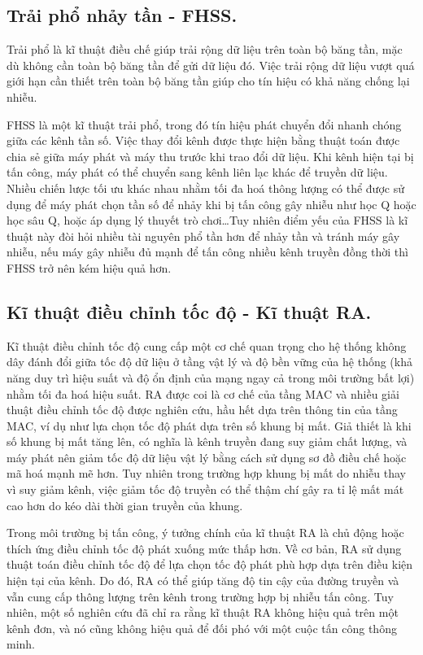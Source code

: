 \documentclass{uetgraduation}
\begin{document}
\subsection{Trải phổ nhảy tần - FHSS.}
Trải phổ là kĩ thuật điều chế giúp trải rộng dữ liệu trên toàn bộ băng tần, mặc dù không cần toàn bộ băng tần để gửi dữ liệu đó. Việc trải rộng dữ liệu vượt quá giới
hạn cần thiết trên toàn bộ băng tần giúp cho tín hiệu có khả năng chống lại nhiễu.

FHSS là một kĩ thuật trải phổ, trong đó tín hiệu phát chuyển đổi nhanh chóng giữa các kênh tần số. Việc thay đổi kênh được thực hiện bằng thuật toán được chia sẻ giữa
máy phát và máy thu trước khi trao đổi dữ liệu. Khi kênh hiện tại bị tấn công, máy phát có thể chuyển sang kênh liên lạc khác để truyền dữ liệu. Nhiều chiến lược tối
ưu khác nhau nhằm tối đa hoá thông lượng có thể được sử dụng để máy phát chọn tần số để nhảy khi bị tấn công gây nhiễu như học Q hoặc học sâu Q, hoặc áp dụng lý thuyết
trò chơi\dots Tuy nhiên điểm yếu của FHSS là kĩ thuật này đòi hỏi nhiều tài nguyên phổ tần hơn để nhảy tần và tránh máy gây nhiễu, nếu máy gây nhiễu đủ mạnh để tấn công
nhiều kênh truyền đồng thời thì FHSS trở nên kém hiệu quả hơn.

\subsection{Kĩ thuật điều chỉnh tốc độ - Kĩ thuật RA.}
Kĩ thuật điều chỉnh tốc độ cung cấp một cơ chế quan trọng cho hệ thống không dây đánh đổi giữa tốc độ dữ liệu ở tầng vật lý và độ bền vững của hệ thống (khả năng duy
trì hiệu suất và độ ổn định của mạng ngay cả trong môi trường bất lợi) nhằm tối đa hoá hiệu suất. RA được coi là cơ chế của tầng MAC và nhiều giải thuật điều chỉnh
tốc độ được nghiên cứu, hầu hết dựa trên thông tin của tầng MAC, ví dụ như lựa chọn tốc độ phát dựa trên số khung bị mất. Giả thiết là khi số khung bị mất tăng lên,
có nghĩa là kênh truyền đang suy giảm chất lượng, và máy phát nên giảm tốc độ dữ liệu vật lý bằng cách sử dụng sơ đồ điều chế hoặc mã hoá mạnh mẽ hơn. Tuy nhiên trong
trường hợp khung bị mất do nhiễu thay vì suy giảm kênh, việc giảm tốc độ truyền có thể thậm chí gây ra tỉ lệ mất mát cao hơn do kéo dài thời gian truyền của khung.

Trong môi trường bị tấn công, ý tưởng chính của kĩ thuật RA là chủ động hoặc thích ứng điều chỉnh tốc độ phát xuống mức thấp hơn. Về cơ bản, RA sử dụng thuật toán điều 
chỉnh tốc độ để lựa chọn tốc độ phát phù hợp dựa trên điều kiện hiện tại của kênh. Do đó, RA có thể giúp tăng độ tin cậy của đường truyền và vẫn cung cấp thông lượng 
trên kênh trong trường hợp bị nhiễu tấn công. Tuy nhiên, một số nghiên cứu đã chỉ ra rằng kĩ thuật RA không hiệu quả trên một kênh đơn, và nó cũng không hiệu
quả để đối phó với một cuộc tấn công thông minh.
\end{document}

